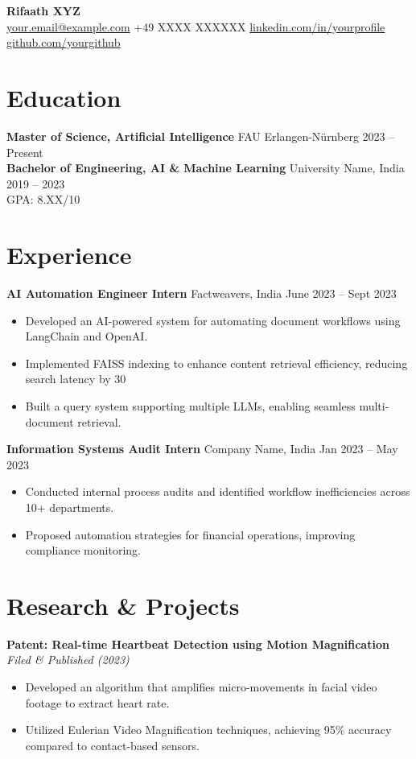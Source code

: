 \documentclass[a4paper,10pt]{article}
\begin{document}
\begin{center}
    \textbf{\LARGE Rifaath XYZ} \\  %
    \small \href{mailto:your.email@example.com}{your.email@example.com} \textbullet{} +49 XXXX XXXXXX \textbullet{} \href{https://linkedin.com/in/yourprofile}{linkedin.com/in/yourprofile} \textbullet{} \href{https://github.com/yourgithub}{github.com/yourgithub}
\end{center}

\section*{Education}
\textbf{Master of Science, Artificial Intelligence} \hfill FAU Erlangen-Nürnberg \hfill 2023 -- Present \\
\textbf{Bachelor of Engineering, AI \& Machine Learning} \hfill University Name, India \hfill 2019 -- 2023 \\
GPA: 8.XX/10  %

\section*{Experience}
\textbf{AI Automation Engineer Intern} \hfill Factweavers, India \hfill June 2023 -- Sept 2023
\begin{itemize}[leftmargin=*]
    \item Developed an AI-powered system for automating document workflows using LangChain and OpenAI.
    \item Implemented FAISS indexing to enhance content retrieval efficiency, reducing search latency by 30%
    \item Built a query system supporting multiple LLMs, enabling seamless multi-document retrieval.
\end{itemize}

\textbf{Information Systems Audit Intern} \hfill Company Name, India \hfill Jan 2023 -- May 2023
\begin{itemize}[leftmargin=*]
    \item Conducted internal process audits and identified workflow inefficiencies across 10+ departments.
    \item Proposed automation strategies for financial operations, improving compliance monitoring.
\end{itemize}

\section*{Research \& Projects}
\textbf{Patent: Real-time Heartbeat Detection using Motion Magnification} \hfill \textit{Filed \& Published (2023)}
\begin{itemize}[leftmargin=*]
    \item Developed an algorithm that amplifies micro-movements in facial video footage to extract heart rate.
    \item Utilized Eulerian Video Magnification techniques, achieving 95\% accuracy compared to contact-based sensors.
\end{itemize}
\end{document}
